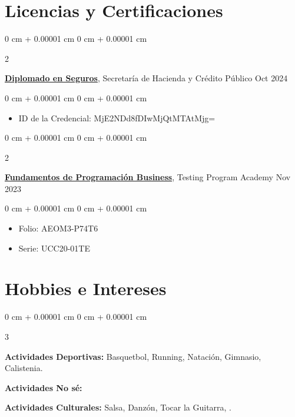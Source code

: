 \documentclass[10pt, letterpaper]{article}
\newenvironment{highlights}{
    \begin{itemize}[
        topsep=0.10 cm,
        parsep=0.10 cm,
        partopsep=0pt,
        itemsep=0pt,
        leftmargin=0 cm + 10pt
    ]
}{
    \end{itemize}
} %
\newenvironment{onecolentry}{
    \begin{adjustwidth}{
        0 cm + 0.00001 cm
    }{
        0 cm + 0.00001 cm
    }
}{
    \end{adjustwidth}
} %
\newenvironment{twocolentry}[2][]{
    \onecolentry
    \def\secondColumn{#2}
    \setcolumnwidth{\fill, 4.5 cm}
    \begin{paracol}{2}
}{
    \switchcolumn \raggedleft \secondColumn
    \end{paracol}
    \endonecolentry
} %
\newenvironment{threecolentry}[3][]{
    \onecolentry
    \def\thirdColumn{#3}
    \setcolumnwidth{, \fill, 4.5 cm}
    \begin{paracol}{3}
    {\raggedright #2} \switchcolumn
}{
    \switchcolumn \raggedleft \thirdColumn
    \end{paracol}
    \endonecolentry
} %
\begin{document}
 \section{Licencias y Certificaciones}

        \begin{twocolentry}{
            Oct 2024
        }
            \href{https://diplomadoenseguros.condusef.gob.mx/qr_verifica.php?ida=21647&idg=3}{\textbf{Diplomado en Seguros}}, Secretaría de Hacienda y Crédito Público\end{twocolentry}

        \vspace{0.10 cm}
        \begin{onecolentry}
            \begin{highlights}
                \item ID de la Credencial: MjE2NDd8fDIwMjQtMTAtMjg=
            \end{highlights}
        \end{onecolentry}

        \begin{twocolentry}{
            Nov 2023
        }
            \href{https://testingprogram.com.mx/validar/}{\textbf{Fundamentos de Programación Business}}, Testing Program Academy\end{twocolentry}

        \vspace{0.10 cm}
        \begin{onecolentry}
            \begin{highlights}
                \item Folio: AEOM3-P74T6
                \item Serie: UCC20-01TE
            \end{highlights}
        \end{onecolentry}

 \section{Hobbies e Intereses}

\begin{threecolentry}{
    \textbf{Actividades Deportivas:} Basquetbol, Running, Natación, Gimnasio, Calistenia.
}{
    \textbf{Actividades Culturales:} Salsa, Danzón, Tocar la Guitarra, . 
}{
    \textbf{Actividades No sé:}
}
\end{threecolentry}
\end{document}

